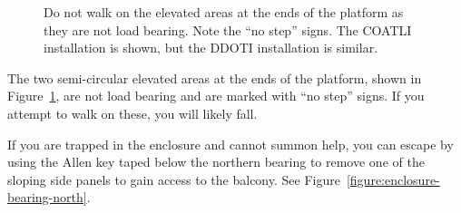 \begin{figure}
\begin{center}
\end{center}
\caption{Do not walk on the elevated areas at the ends of the platform as they are not load bearing. Note the “no step” signs.
\ifddotioan
The COATLI installation is shown, but the DDOTI installation is similar.
\fi
}
\label{figure:enclosure-elevated}
\end{figure}

The two semi-circular elevated areas at the ends of the platform, shown in Figure~\ref{figure:enclosure-elevated}, are not load bearing and are marked with “no step” signs. If you attempt to walk on these, you will likely fall.


If you are trapped in the enclosure and cannot summon help, you can escape by using the Allen key taped below the northern bearing to remove one of the sloping side panels to gain access to the balcony. See Figure~\ref{figure:enclosure-bearing-north}.

